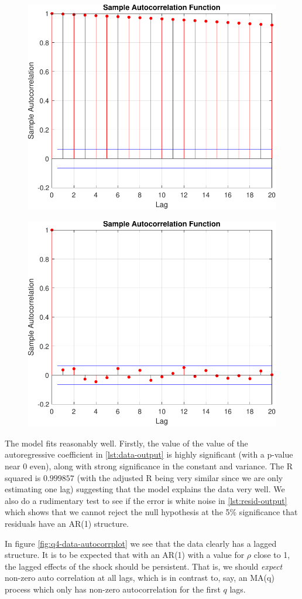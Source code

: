 \documentclass[11pt]{article}
\begin{document}
\begin{enumerate}
\begin{figure}[htp]
\centering
\begin{minipage}{.5\textwidth}
  \centering
  \includegraphics[width=.4\linewidth]{data-simulated-autocorrelation-plot.pdf}
  \label{fig:q4-data-simulated-autocorrplot}
\end{minipage}%
\begin{minipage}{.5\textwidth}
  \centering
  \includegraphics[width=.4\linewidth]{residual-simulated-autocorrelation-plot.pdf}
  \label{fig:q4-residual-simulated-autocorrplot}
\end{minipage}
\end{figure}

The model fits reasonably well. Firstly, the value of the value of the autoregressive coefficient in \ref{lst:data-output} is highly significant (with a p-value near 0 even), along with strong significance in the constant and variance. The R squared is \( 0.999857 \) (with the adjusted R being very similar since we are only estimating one lag) suggesting that the model explains the data very well. We also do a rudimentary test to see if the error is white noise in \ref{lst:resid-output} which shows that we cannot reject the null hypothesis at the 5\% significance that residuals have an AR(1) structure.

In figure \ref{fig:q4-data-autocorrplot} we see that the data clearly has a lagged structure. It is to be expected that with an AR(1) with a value for \( \rho \) close to 1, the lagged effects of the shock should be persistent. That is, we should {\itshape expect} non-zero auto correlation at all lags, which is in contrast to, say, an MA(q) process which only has non-zero autocorrelation for the first \( q \) lags. 


\end{enumerate}
\end{document}
